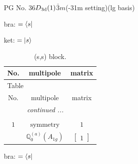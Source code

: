 \documentclass[fleqn,8pt,landscape]{jsarticle}
\begin{document}
\setcounter{MaxMatrixCols}{32}

\renewcommand{\tablename}{Table~}
\renewcommand{\figurename}{Figure~}
\begin{center}
\LARGE
PG No. 36\quad$D_{\rm 3d}(1)$\quad$\bar{3}m$\quad(-31m setting)\quad[ trigonal ] (lg basis)
\end{center}
bra: $=\bra{s}$

\noindent
ket: $=\ket{s}$
\renewcommand{\arraystretch}{1.6}
\begin{longtable}{ccc}
\caption{(s,s) block.}
 \\
 \hline \hline
No. & multipole & matrix \\ \hline \endfirsthead

\multicolumn{2}{l}{\tablename\ \thetable{}} \\
 \hline \hline
No. & multipole & matrix \\ \hline \endhead

 \hline \hline
\multicolumn{2}{r}{\footnotesize\it continued ...} \\ \endfoot

 \hline \hline
\multicolumn{2}{r}{} \\ \endlastfoot

$ 1 $ & $ \text{symmetry} $ & $ 1 $ \\
$  $ & $ \mathbb{Q}_{0}^{(a)}(A_{1g}) $ & $ \begin{bmatrix} 1 \end{bmatrix} $ \\ \hline
\end{longtable}
bra: $=\bra{s}$
\end{document}
